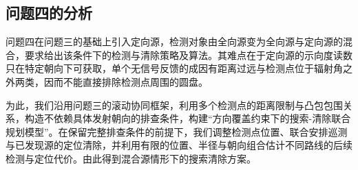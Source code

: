 \subsection{问题四的分析}

问题四在问题三的基础上引入定向源，检测对象由全向源变为全向源与定向源的混合，要求给出该条件下的检测与清除策略及算法。其难点在于定向源的示向度读数只在特定朝向下可获取，单个无信号反馈的成因有距离过远与检测点位于辐射角之外两类，因而不能直接排除检测点周围的圆盘。

为此，我们沿用问题三的滚动协同框架，利用多个检测点的距离限制与凸包包围关系，构造不依赖具体发射朝向的排查条件，构建“方向覆盖约束下的搜索-清除联合规划模型”。在保留完整排查条件的前提下，我们调整检测点位置、联合安排巡测与已发现源的定位清除，并利用有限的位置、半径与朝向组合估计不同路线的后续检测与定位代价。由此得到混合源情形下的搜索清除方案。
